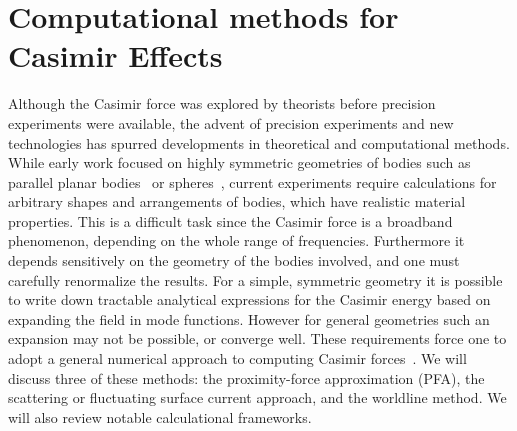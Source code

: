 \section{Computational methods for Casimir Effects}
\label{sec:numerical_review}
Although the Casimir force was explored by theorists before precision experiments were available,
the advent of precision experiments and new technologies has spurred developments in 
theoretical and computational methods.
While early work focused on highly symmetric geometries 
of bodies such as parallel planar bodies~\cite{Casimir1948} or spheres~\cite{Boyer1968}, 
current experiments require calculations for arbitrary shapes and arrangements of bodies, 
which have realistic material properties.  
This is a difficult task since the Casimir force is a broadband phenomenon, depending on the whole 
range of frequencies.  Furthermore it depends sensitively on the geometry of the bodies involved, 
and one must carefully renormalize the results.  
For a simple, symmetric geometry it is possible to write down tractable analytical expressions for
the Casimir energy based on expanding the field in mode functions.  However for general geometries 
such an expansion may not be possible, or converge well.
These requirements force one to adopt a general numerical approach to computing Casimir forces~\cite{Johnson2011}.
We will discuss three of these methods: the proximity-force approximation (PFA), the scattering
or fluctuating surface current approach, and the worldline method.  We will also review notable
calculational frameworks.  


